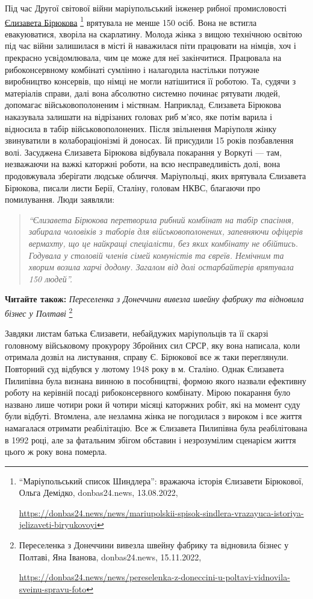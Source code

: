 Під час Другої світової війни маріупольський інженер рибної промисловості
\href{https://donbas24.news/news/mariupolskii-spisok-sindlera-vrazayuca-istoriya-jelizaveti-biryukovoyi}{Єлизавета Бірюкова}%
\footnote{\enquote{Маріупольський список Шиндлера}: вражаюча історія Єлизавети Бірюкової, Ольга Демідко, donbas24.news, 13.08.2022, \par\url{https://donbas24.news/news/mariupolskii-spisok-sindlera-vrazayuca-istoriya-jelizaveti-biryukovoyi}} %
врятувала не менше 150 осіб. Вона не встигла евакуюватися,
хворіла на скарлатину. Молода жінка з вищою технічною освітою під час війни
залишилася в місті й наважилася піти працювати на німців, хоч і прекрасно
усвідомлювала, чим це може для неї закінчитися. Працювала на рибоконсервному
комбінаті сумлінно і налагодила настільки потужне виробництво консервів, що
німці не могли натішитися її роботою. Та, судячи з матеріалів справи, далі вона
абсолютно системно починає рятувати людей, допомагає військовополоненим і
містянам. Наприклад, Єлизавета Бірюкова наказувала залишати на відрізаних
головах риб м'ясо, яке потім варила і відносила в табір військовополонених.
Після звільнення Маріуполя жінку звинуватили в колабораціонізмі й доносах. Їй
присудили 15 років позбавлення волі. Засуджена Єлизавета Бірюкова відбувала
покарання у Воркуті — там, незважаючи на важкі каторжні роботи, на всю
несправедливість долі, вона продовжувала зберігати людське обличчя.
Маріупольці, яких врятувала Єлизавета Бірюкова, писали листи Берії, Сталіну,
головам НКВС, благаючи про помилування. Люди заявляли: 

\begin{quote}
\em\enquote{Єлизавета Бірюкова
перетворила рибний комбінат на табір спасіння, забирала чоловіків з таборів для
військовополонених, запевняючи офіцерів вермахту, що це найкращі спеціалісти,
без яких комбінату не обійтись. Годувала у столовій членів сімей комуністів та
євреїв. Немічним та хворим возила харчі додому. Загалом від долі остарбайтерів
врятувала 150 людей}.
\end{quote}

\textbf{Читайте також:} \emph{Переселенка з Донеччини вивезла швейну фабрику та відновила бізнес у Полтаві}%
\footnote{Переселенка з Донеччини вивезла швейну фабрику та відновила бізнес у Полтаві, Яна Іванова, donbas24.news, 15.11.2022, \par%
\url{https://donbas24.news/news/pereselenka-z-doneccini-u-poltavi-vidnovila-sveinu-spravu-foto}%
}

Завдяки листам батька Єлизавети, небайдужих маріупольців та її скарзі головному
військовому прокурору Збройних сил СРСР, яку вона написала, коли отримала
дозвіл на листування, справу Є. Бірюкової все ж таки переглянули. Повторний суд
відбувся у лютому 1948 року в м. Сталіно. Однак Єлизавета Пилипівна була
визнана винною в пособництві, формою якого назвали ефективну роботу на керівній
посаді рибоконсервного комбінату. Мірою покарання було названо лише чотири роки
й чотири місяці каторжних робіт, які на момент суду були відбуті. Втомлена, але
незламна жінка не погодилася з вироком і все життя намагалася отримати
реабілітацію. Все ж Єлизавета Пилипівна була реабілітована в 1992 році, але за
фатальним збігом обставин і незрозумілим сценарієм життя цього ж року вона
померла.

